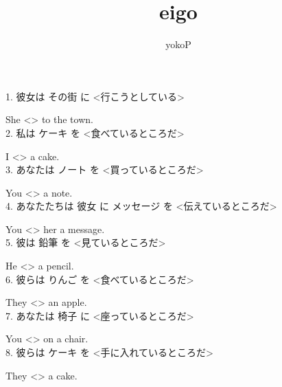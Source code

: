 \documentclass[uplatex,
paper=a4,
fontsize=18pt,
jafontsize=16pt,
number_of_lines=30,
line_length=30zh,
baselineskip=25pt,
]{jlreq}
\author{yokoP}
\title{eigo}
\begin{document}
1.  彼女は その街 に <行こうとしている>

  She <\hspace{3em}\hspace{3em}\hspace{2em}> to the town.
\\

2.  私は ケーキ を <食べているところだ>

  I <\hspace{3em}\hspace{3em}\hspace{2em}> a cake.
\\

3.  あなたは ノート を <買っているところだ>

  You <\hspace{3em}\hspace{3em}\hspace{2em}> a note.
\\

4.  あなたたちは 彼女 に メッセージ を <伝えているところだ>

  You <\hspace{3em}\hspace{3em}\hspace{2em}> her a message.
\\

5.  彼は 鉛筆 を <見ているところだ>

  He <\hspace{3em}\hspace{3em}\hspace{2em}> a pencil.
\\

6.  彼らは りんご を <食べているところだ>

  They <\hspace{3em}\hspace{3em}\hspace{2em}> an apple.
\\

7.  あなたは 椅子 に <座っているところだ>

  You <\hspace{3em}\hspace{3em}\hspace{2em}> on a chair.
\\

8.  彼らは ケーキ を <手に入れているところだ>

  They <\hspace{3em}\hspace{3em}\hspace{2em}> a cake.
\\
\end{document}
